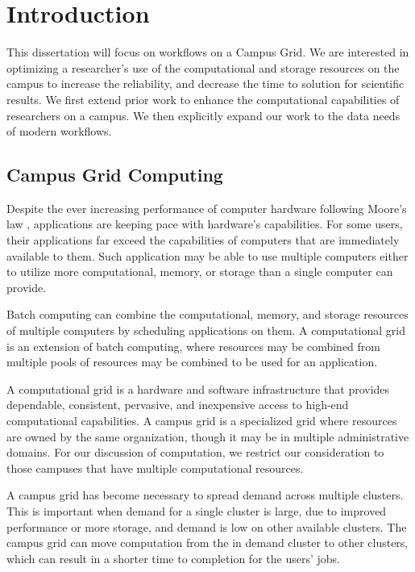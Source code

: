 \chapter{Introduction}

This dissertation will focus on workflows on a Campus Grid.  We are interested in optimizing a researcher's use of the computational and storage resources on the campus to increase the reliability, and decrease the time to solution for scientific results.  We first extend prior work to enhance the computational capabilities of researchers on a campus.  We then explicitly expand our work to the data needs of modern workflows.

\section{Campus Grid Computing}

Despite the ever increasing performance of computer hardware following Moore's law \cite{schaller1997moore}, applications are keeping pace with hardware's capabilities.  For some users, their applications far exceed the capabilities of computers that are immediately available to them.  Such application may be able to use multiple computers either to utilize more computational, memory, or storage than a single computer can provide.

Batch computing can combine the computational, memory, and storage resources of multiple computers by scheduling applications on them.  A computational grid is an extension of batch computing, where resources may be combined from multiple pools of resources may be combined to be used for an application.

A computational grid is a hardware and software infrastructure that provides dependable, consistent, pervasive, and inexpensive access to high-end computational capabilities\cite{foster2004grid}.  A campus grid is a specialized grid where resources are owned by the same organization, though it may be in multiple administrative domains.  For our discussion of computation, we restrict our consideration to those campuses that have multiple computational resources.

A campus grid has become necessary to spread demand across multiple clusters.  This is important when demand for a single cluster is large, due to improved performance or more storage, and demand is low on other available clusters.  The campus grid can move computation from the in demand cluster to other clusters, which can result in a shorter time to completion for the users' jobs.

